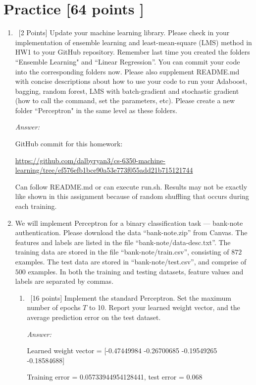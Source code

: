 \documentclass[12pt, fullpage,letterpaper]{article}
\begin{document}
\section{Practice [64 points ]}
\begin{enumerate}
	\item~[2 Points] Update your machine learning library. Please check in your implementation of ensemble learning and least-mean-square (LMS) method in HW1 to your GitHub repository. Remember last time you created the folders ``Ensemble Learning" and ``Linear Regression''. You can commit your code into the corresponding folders now. Please also supplement README.md with concise descriptions about how to use your code to run your Adaboost, bagging, random forest, LMS with batch-gradient and stochastic gradient (how to call the command, set the parameters, etc). Please create a new folder ``Perceptron" in the same level as these folders.  

	\textit{Answer:}

	GitHub commit for this homework: 

	\url{https://github.com/dalbyryan3/cs-6350-machine-learning/tree/ef576efb1bce90a53e773f055add21b715121744}

	Can follow README.md or can execute run.sh. 
	Results may not be exactly like shown in this assignment because of random shuffling that occurs during each training.


\item We will implement  Perceptron for a binary classification task --- bank-note authentication. Please download the data ``bank-note.zip'' from Canvas. The features and labels are listed in the file ``bank-note/data-desc.txt''. The training data are stored in the file ``bank-note/train.csv'', consisting of $872$ examples. The test data are stored in ``bank-note/test.csv'', and comprise of $500$ examples. In both the training and testing datasets, feature values and labels are separated by commas. 
\begin{enumerate}
	\item~[16 points] Implement the standard Perceptron. Set the maximum number of epochs $T$ to 10. Report your learned weight vector, and the average prediction error on the test dataset. 

	\textit{Answer:}

	Learned weight vector = [-0.47449984 -0.26700685 -0.19549265 -0.18584688]
	
	Training error = 0.05733944954128441, test error = 0.068


\end{enumerate}
\end{enumerate}
\end{document}
